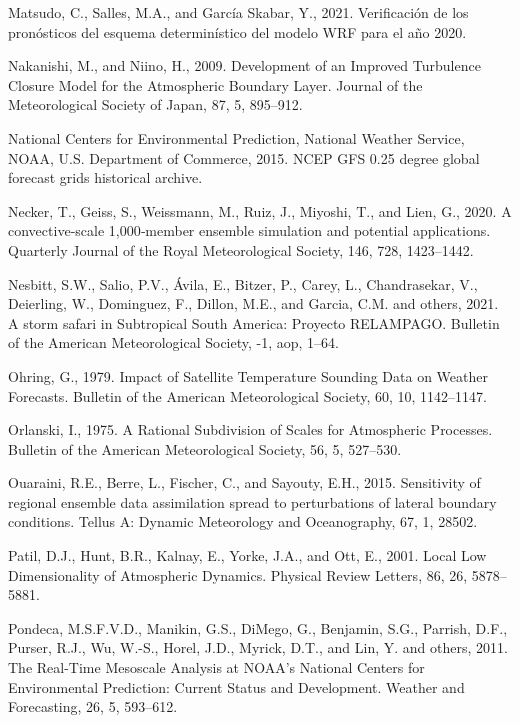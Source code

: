 \documentclass[12pt,oneside,a4paper]{reedthesis}
\begin{document}
\leavevmode\hypertarget{ref-matsudo2021}{}%
Matsudo, C., Salles, M.A., and García Skabar, Y., 2021. Verificación de los pronósticos del esquema determinístico del modelo WRF para el año 2020.

\leavevmode\hypertarget{ref-nakanishi2009}{}%
Nakanishi, M., and Niino, H., 2009. Development of an Improved Turbulence Closure Model for the Atmospheric Boundary Layer. Journal of the Meteorological Society of Japan, 87, 5, 895--912.

\leavevmode\hypertarget{ref-cisl_rda_ds084.1}{}%
National Centers for Environmental Prediction, National Weather Service, NOAA, U.S. Department of Commerce, 2015. NCEP GFS 0.25 degree global forecast grids historical archive.

\leavevmode\hypertarget{ref-necker2020}{}%
Necker, T., Geiss, S., Weissmann, M., Ruiz, J., Miyoshi, T., and Lien, G., 2020. A convective‐scale 1,000‐member ensemble simulation and potential applications. Quarterly Journal of the Royal Meteorological Society, 146, 728, 1423--1442.

\leavevmode\hypertarget{ref-nesbitt2021}{}%
Nesbitt, S.W., Salio, P.V., Ávila, E., Bitzer, P., Carey, L., Chandrasekar, V., Deierling, W., Dominguez, F., Dillon, M.E., and Garcia, C.M. and others, 2021. A storm safari in Subtropical South America: Proyecto RELAMPAGO. Bulletin of the American Meteorological Society, -1, aop, 1--64.

\leavevmode\hypertarget{ref-ohring1979}{}%
Ohring, G., 1979. Impact of Satellite Temperature Sounding Data on Weather Forecasts. Bulletin of the American Meteorological Society, 60, 10, 1142--1147.

\leavevmode\hypertarget{ref-orlanski1975}{}%
Orlanski, I., 1975. A Rational Subdivision of Scales for Atmospheric Processes. Bulletin of the American Meteorological Society, 56, 5, 527--530.

\leavevmode\hypertarget{ref-ouaraini2015}{}%
Ouaraini, R.E., Berre, L., Fischer, C., and Sayouty, E.H., 2015. Sensitivity of regional ensemble data assimilation spread to perturbations of lateral boundary conditions. Tellus A: Dynamic Meteorology and Oceanography, 67, 1, 28502.

\leavevmode\hypertarget{ref-patil2001}{}%
Patil, D.J., Hunt, B.R., Kalnay, E., Yorke, J.A., and Ott, E., 2001. Local Low Dimensionality of Atmospheric Dynamics. Physical Review Letters, 86, 26, 5878--5881.

\leavevmode\hypertarget{ref-pondeca2011}{}%
Pondeca, M.S.F.V.D., Manikin, G.S., DiMego, G., Benjamin, S.G., Parrish, D.F., Purser, R.J., Wu, W.-S., Horel, J.D., Myrick, D.T., and Lin, Y. and others, 2011. The Real-Time Mesoscale Analysis at NOAA's National Centers for Environmental Prediction: Current Status and Development. Weather and Forecasting, 26, 5, 593--612.
\end{document}
